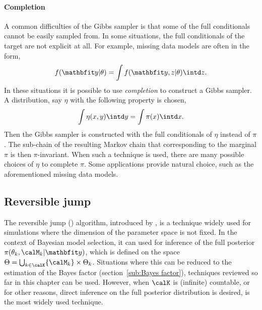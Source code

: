 \paragraph{Completion}

A common difficulties of the Gibbs sampler is that some of the full
conditionals cannot be easily sampled from. In some situations, the full
conditionals of the target are not explicit at all. For example, missing data
models are often in the form,
\begin{equation*}
  f(\data|\theta) = \int f(\data, z|\theta)\intd z.
\end{equation*}
In these situations it is possible to use \emph{completion} to construct a
Gibbs sampler. A distribution, say $\eta$ with the following property is
chosen,
\begin{equation}
  \int\eta(x,y)\intd y = \int\pi(x)\intd x.
\end{equation}
Then the Gibbs sampler is constructed with the full conditionals of $\eta$
instead of $\pi$. The sub-chain of the resulting Markov chain that
corresponding to the marginal $\pi$ is then $\pi$-invariant. When such a
technique is used, there are many possible choices of $\eta$ to complete
$\pi$. Some applications provide natural choice, such as the aforementioned
missing data models.

\subsection{Reversible jump \protect\mcmc}
\label{sub:Reversible jump mcmc}

The reversible jump \mcmc (\rjmcmc) algorithm, introduced by
\cite{Green:1995dg}, is a technique widely used for simulations where the
dimension of the parameter space is not fixed. In the context of Bayesian
model selection, it can used for inference of the full posterior
$\pi(\theta_k,\calM_k|\data)$, which is defined on the space $\Theta =
\bigcup_{k\in\calK}\{\calM_k\}\times\Theta_k$. Situations where this can be
reduced to the estimation of the Bayes factor (section~\ref{sub:Bayes
  factor}), techniques reviewed so far in this chapter can be used. However,
when $\calK$ is (infinite) countable, or for other reasons, direct inference
on the full posterior distribution is desired, \rjmcmc is the most widely used
technique.

